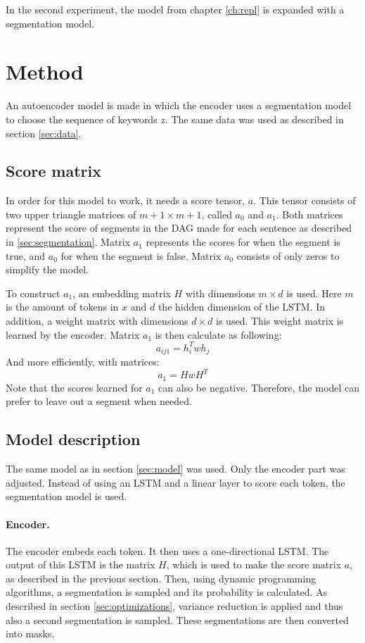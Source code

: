 In the second experiment, the model from chapter \ref{ch:repl} is expanded with a segmentation model. 

\section{Method}
An autoencoder model is made in which the encoder uses a segmentation model to choose the sequence of keywords $z$.
The same data was used as described in section \ref{sec:data}.

\subsection{Score matrix}
In order for this model to work, it needs a score tensor, $a$.
This tensor consists of two upper triangle matrices of $m+1 \times m+1$, called $a_0$ and $a_1$.
Both matrices represent the score of segments in the DAG made for each sentence as described in \ref{sec:segmentation}. 
Matrix $a_1$ represents the scores for when the segment is true, and $a_0$ for when the segment is false.
Matrix $a_0$ consists of only zeros to simplify the model.

To construct $a_1$, an embedding matrix $H$ with dimensions $m \times d$ is used.
Here $m$ is the amount of tokens in $x$ and $d$ the hidden dimension of the LSTM.
In addition, a weight matrix with dimensions $d \times d$ is used.
This weight matrix is learned by the encoder. 
Matrix $a_1$ is then calculate as following:
\begin{equation}
    a_{ij1} = h_i^T w h_j
\end{equation}
And more efficiently, with matrices:
\begin{equation}
    a_1 = H w H^T
\end{equation}
Note that the scores learned for $a_1$ can also be negative. 
Therefore, the model can prefer to leave out a segment when needed.

\subsection{Model description}
The same model as in section \ref{sec:model} was used. 
Only the encoder part was adjusted.
Instead of using an LSTM and a linear layer to score each token, the segmentation model is used.

\paragraph{Encoder.} The encoder embeds each token. 
It then uses a one-directional LSTM. 
The output of this LSTM is the matrix $H$, which is used to make the score matrix $a$, as described in the previous section. 
Then, using dynamic programming algorithms, a segmentation is sampled and its probability is calculated. 
As described in section \ref{sec:optimizations}, variance reduction is applied and thus also a second segmentation is sampled.
These segmentations are then converted into masks.

